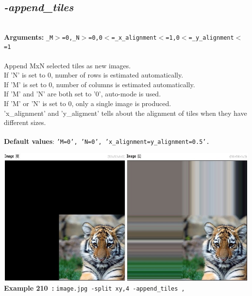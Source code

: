\documentclass[a4paper,11pt,twoside]{book}
\begin{document}
\subsection{\emph{-append\_tiles} }\vspace*{-0.5em}
~\\\textbf{Arguments: } 
{\small \texttt{\_M$>$=0,\_N$>$=0,0$<$=\_x\_alignment$<$=1,0$<$=\_y\_alignment$<$=1}}\\~\\
Append MxN selected tiles as new images.
~\\If 'N' is set to 0, number of rows is estimated automatically.
~\\If 'M' is set to 0, number of columns is estimated automatically.
~\\If 'M' and 'N' are both set to '0', auto-mode is used.
~\\If 'M' or 'N' is set to 0, only a single image is produced.
~\\'x\_alignment' and 'y\_aligment' tells about the alignment of tiles when they have different sizes.
~\\~\\\textbf{Default values}: {\small \texttt{'M=0', 'N=0', 'x\_alignment=y\_alignment=0.5'.}}
\begin{center}\includegraphics[keepaspectratio=true,height=7cm,width=\textwidth]{img/gmic_def210.jpg}\\
{\footnotesize \textbf{Example 210~:} \texttt{image.jpg -split xy,4 -append\_tiles ,}}
\end{center}
\end{document}
